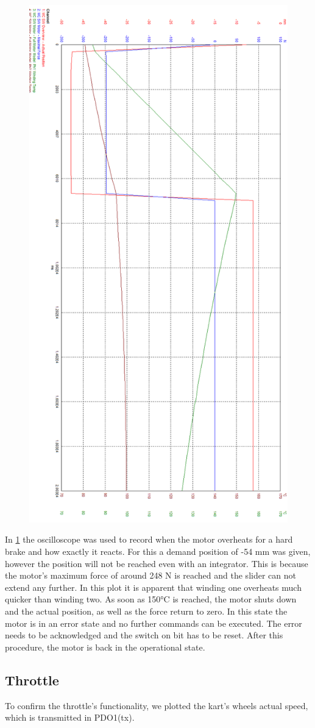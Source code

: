 \begin{figure}
	\centering
	\includegraphics[width=0.7\linewidth]{pictures_figures/oscilloscope_neg54_rot}
	\caption{}
	\label{fig:oscilloscopeneg54rot}
\end{figure}


In \cref{fig:oscilloscopeneg54rot} the oscilloscope was used to record when the motor overheats for a hard brake and how exactly it reacts. For this a demand position of -54 mm was given, however the position will not be reached even with an integrator. This is because the motor's maximum force of around 248 N is reached and the slider can not extend any further. In this plot it is apparent that winding one overheats much quicker than winding two. As soon as 150°C is reached, the motor shuts down and the actual position, as well as the force return to zero. In this state the motor is in an error state and no further commands can be executed. The error needs to be acknowledged and the switch on bit has to be reset. After this procedure, the motor is back in the operational state.

\newpage

\subsection{Throttle}

To confirm the throttle's functionality, we plotted the kart's wheels actual speed, which is transmitted in PDO1(tx). 

